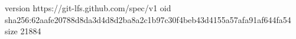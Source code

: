 version https://git-lfs.github.com/spec/v1
oid sha256:62aafe20788d8da3d4d8d2ba8a2c1b97c30f4beb43d4155a57afa91af644fa54
size 21884
